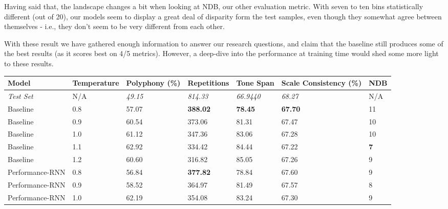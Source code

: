 \documentclass[a4paper]{book}
\begin{document}
Having said that, the landscape changes a bit when looking at NDB, our other evaluation metric. With seven to ten bins statistically different (out of 20), our models seem to display a great deal of disparity form the test samples, even though they somewhat agree between themselves - i.e., they don't seem to be very different from each other.

With these result we have gathered enough information to answer our research questions, and claim that the baseline still produces some of the best results (as it scores best on 4/5 metrics). However, a deep-dive into the performance at training time would shed some more light to these results.

\begin{landscape}
\begin{table}[t]
    \centering
\begin{tabular}{l|l|l|l|l|l|l}
    Model             & Temperature & Polyphony (\%)  & Repetitions       & Tone Span        & Scale Consistency (\%) & NDB     \\ \hline
\textit{Test Set} & N/A         & \textit{49.15} & \textit{814.33} & \textit{66.9440} & \textit{68.27}   & N/A     \\
Baseline          & 0.8         & 57.07          & \textbf{\color{base0D}388.02}    & \textbf{\color{base0D}78.45}          & \textbf{\color{base0D}67.70}            & 11      \\
Baseline          & 0.9         & 60.54          & 373.06          & 81.31          & 67.47            & 10      \\
Baseline          & 1.0         & 61.12          & 347.36          & 83.06          & 67.28            & 10      \\
Baseline          & 1.1         & 62.92          & 334.42          & 84.44          & 67.22            & \textbf{\color{base0D}7} \\
Baseline          & 1.2         & 60.60          & 316.82          & 85.05          & 67.26            & 9       \\
Performance-RNN   & 0.8         & 56.84          & \textbf{\color{base0A}377.82}          & 78.84          & 67.60            & 9       \\
Performance-RNN   & 0.9         & 58.52          & 364.97          & 81.49          & 67.57            & 8       \\
Performance-RNN   & 1.0         & 62.19          & 354.08          & 83.24          & 67.30            & 9       \\

\end{tabular}
\end{table}
\end{landscape}
\end{document}
